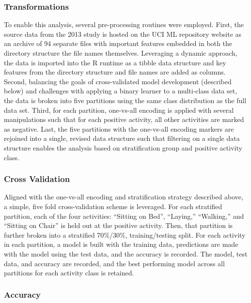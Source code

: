 \documentclass[
]{article}
\begin{document}
\subsubsection{Transformations}\label{transformations}

To enable this analysis, several pre-processing routines were employed.
First, the source data from the 2013 study is hosted on the UCI ML
repository website as an archive of 94 separate files with important
features embedded in both the directory structure the file names
themselves. Leveraging a dynamic approach, the data is imported into the
R runtime as a tibble data structure and key features from the directory
structure and file names are added as columns. Second, balancing the
goals of cross-validated model development (described below) and
challenges with applying a binary learner to a multi-class data set, the
data is broken into five partitions using the same class distribution as
the full data set. Third, for each partition, one-vs-all encoding is
applied with several manipulations such that for each positive activity,
all other activities are marked as negative. Last, the five partitions
with the one-vs-all encoding markers are rejoined into a single, revised
data structure such that filtering on a single data structure enables
the analysis based on stratification group and positive activity class.

\subsubsection{Cross Validation}\label{cross-validation}

Aligned with the one-vs-all encoding and stratification strategy
described above, a simple, five fold cross-validation scheme is
leveraged. For each stratified partition, each of the four activities:
``Sitting on Bed'', ``Laying,'' ``Walking,'' and ``Sitting on Chair'' is
held out at the positive activity. Then, that partition is further
broken into a stratified 70\%/30\%, training/testing split. For each
activity in each partition, a model is built with the training data,
predictions are made with the model using the test data, and the
accuracy is recorded. The model, test data, and accuracy are recorded,
and the best performing model across all partitions for each activity
class is retained.

\subsubsection{Accuracy}\label{accuracy}
\end{document}
